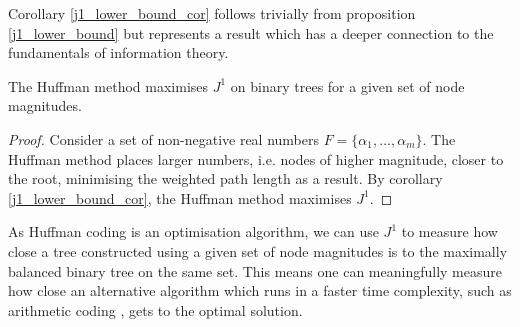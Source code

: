 Corollary \ref{j1_lower_bound_cor} follows trivially from proposition \ref{j1_lower_bound} but represents a result which has a deeper connection to the fundamentals of information theory.

\begin{proposition}
    The Huffman method \cite{huffman_method_nodate} maximises $J^1$ on binary trees for a given set of node magnitudes.
\end{proposition}
\begin{proof}
    Consider a set of non-negative real numbers $F = \{\alpha_1, \dots, \alpha_m\}$. The Huffman method places larger numbers, i.e. nodes of higher magnitude, closer to the root, minimising the weighted path length as a result. By corollary \ref{j1_lower_bound_cor}, the Huffman method maximises $J^1$.
\end{proof}
As Huffman coding is an optimisation algorithm, we can use $J^1$ to measure how close a tree constructed using a given set of node magnitudes is to the maximally balanced binary tree on the same set. This means one can meaningfully measure how close an alternative algorithm which runs in a faster time complexity, such as arithmetic coding \cite{pasco_source}, gets to the optimal solution.

